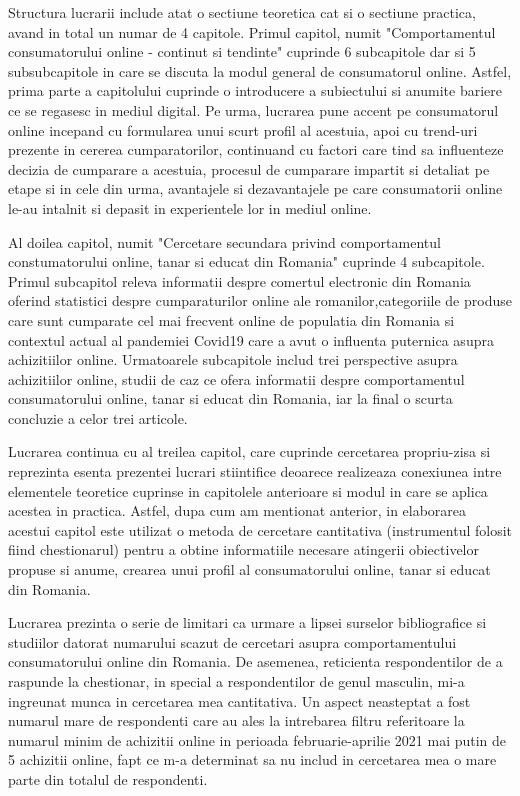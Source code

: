 \documentclass[a4paper, 12pt]{article}
\begin{document}
	\quad Structura lucrarii include atat o sectiune teoretica cat si o sectiune practica, avand in total un numar de 4 capitole. Primul capitol, numit "Comportamentul consumatorului online - continut si tendinte" cuprinde 6 subcapitole dar si 5 subsubcapitole in care se discuta la modul general de consumatorul online. Astfel, prima parte a capitolului cuprinde o introducere a subiectului si anumite bariere ce se regasesc in mediul digital. Pe urma, lucrarea pune accent pe consumatorul online incepand cu formularea unui scurt profil al acestuia, apoi cu trend-uri prezente in cererea cumparatorilor, continuand cu factori care tind sa influenteze decizia de cumparare a acestuia, procesul de cumparare impartit si detaliat pe etape si in cele din urma, avantajele si dezavantajele pe care consumatorii online le-au intalnit si depasit in experientele lor in mediul online. 
	
	\quad Al doilea capitol, numit "Cercetare secundara privind comportamentul constumatorului online, tanar si educat din Romania" cuprinde 4 subcapitole. Primul subcapitol releva informatii despre comertul electronic din Romania oferind statistici despre cumparaturilor online ale romanilor,categoriile de produse care sunt cumparate cel mai frecvent online de populatia din Romania si contextul actual al pandemiei Covid19 care a avut o influenta puternica asupra achizitiilor online. Urmatoarele subcapitole includ trei perspective asupra achizitiilor online, studii de caz ce ofera informatii despre comportamentul consumatorului online, tanar si educat din Romania, iar la final o scurta concluzie a celor trei articole.
	
	\quad Lucrarea continua cu al treilea capitol, care cuprinde cercetarea propriu-zisa si reprezinta esenta prezentei lucrari stiintifice deoarece realizeaza conexiunea intre elementele teoretice cuprinse in capitolele anterioare si modul in care se aplica acestea in practica. Astfel, dupa cum am mentionat anterior, in elaborarea acestui capitol este utilizat o metoda de cercetare cantitativa (instrumentul folosit fiind chestionarul) pentru a obtine informatiile necesare atingerii obiectivelor propuse si anume, crearea unui profil al consumatorului online, tanar si educat din Romania.
	
	\quad Lucrarea prezinta o serie de limitari ca urmare a lipsei surselor bibliografice si studiilor datorat numarului scazut de cercetari asupra comportamentului consumatorului online din Romania. De asemenea, reticienta respondentilor de a raspunde la chestionar, in special a respondentilor de genul masculin, mi-a ingreunat munca in cercetarea mea cantitativa. Un aspect neasteptat a fost numarul mare de respondenti care au ales la intrebarea filtru referitoare la numarul minim de achizitii online in perioada februarie-aprilie 2021 mai putin de 5 achizitii online, fapt ce m-a determinat sa nu includ in cercetarea mea o mare parte din totalul de respondenti.
	
\end{document}
